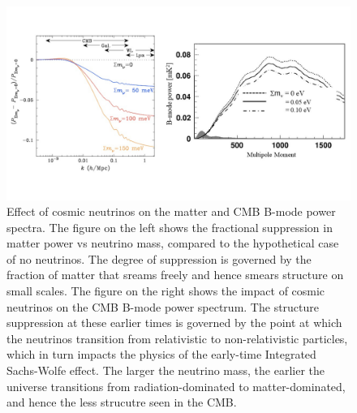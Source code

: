 \begin{figure}
    \centering
    \includegraphics[width=\linewidth, trim=0cm 2cm 0cm 2cm, clip]{ScientificMotivation/Figures/neutrino_ps.jpg}
    \caption[Effect of cosmic neutrinos on the matter and CMB B-mode power spectra]{Effect of cosmic neutrinos on the matter and CMB B-mode power spectra. The figure on the left shows the fractional suppression in matter power vs neutrino mass, compared to the hypothetical case of no neutrinos. The degree of suppression is governed by the fraction of matter that sreams freely and hence smears structure on small scales. The figure on the right shows the impact of cosmic neutrinos on the CMB B-mode power spectrum. The structure suppression at these earlier times is governed by the point at which the neutrinos transition from relativistic to non-relativistic particles, which in turn impacts the physics of the early-time Integrated Sachs-Wolfe effect. The larger the neutrino mass, the earlier the universe transitions from radiation-dominated to matter-dominated, and hence the less strucutre seen in the CMB. \cite{abazajian_neutrino_2015}}
    \label{fig:neutrino_ps}
\end{figure}

